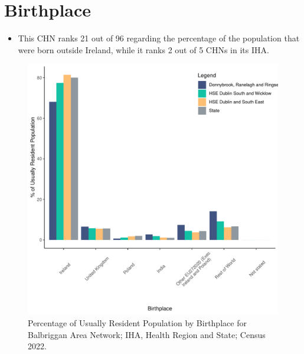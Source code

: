 \documentclass{article}
\begin{document}
\section{Birthplace}\label{sect:Birth}
\begin{itemize}
\item This CHN ranks  21 out of 96 regarding the percentage of the population that were born outside Ireland, while it ranks  2 out of 5 CHNs in its IHA.
\end{itemize}
\begin{figure}[H]
	\centering
	\includegraphics[width = 130mm]{../figures/BirthED.pdf}
	\caption{Percentage of Usually Resident Population by Birthplace for Balbriggan Area Network; IHA, Health Region and State; Census 2022.}
	\label{fig:vbnv}
	\end{figure}
	
\end{document}
